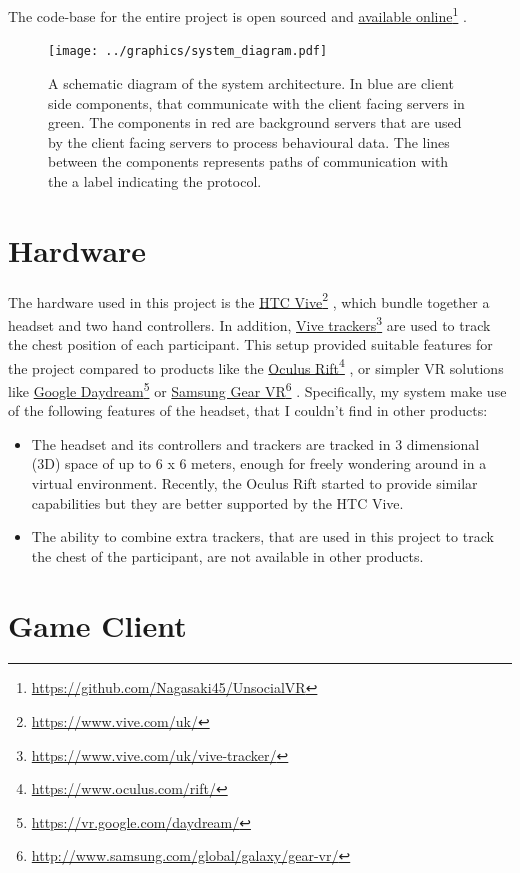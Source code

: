 \documentclass[]{simple-thesis}
\newcommand\fnurl[2]{%
  \href{#2}{#1}\footnote{\url{#2}}%
}
\begin{document}
The code-base for the entire project is open sourced and \fnurl{available online}{https://github.com/Nagasaki45/UnsocialVR}.

\begin{figure}
  \texttt{[image: ../graphics/system\_diagram.pdf]}
  \caption{A schematic diagram of the system architecture. In blue are client side components, that communicate with the client facing servers in green. The components in red are background servers that are used by the client facing servers to process behavioural data. The lines between the components represents paths of communication with the a label indicating the protocol.}
  \label{fig:system:diagram}
\end{figure}

\section{Hardware}

The hardware used in this project is the \fnurl{HTC Vive}{https://www.vive.com/uk/}, which bundle together a headset and two hand controllers.
In addition, \fnurl{Vive trackers}{https://www.vive.com/uk/vive-tracker/} are used to track the chest position of each participant.
This setup provided suitable features for the project compared to products like the \fnurl{Oculus Rift}{https://www.oculus.com/rift/}, or simpler VR solutions like \fnurl{Google Daydream}{https://vr.google.com/daydream/} or \fnurl{Samsung Gear VR}{http://www.samsung.com/global/galaxy/gear-vr/}.
Specifically, my system make use of the following features of the headset, that I couldn't find in other products:

\begin{itemize}
  \item The headset and its controllers and trackers are tracked in 3 dimensional (3D) space of up to 6 x 6 meters, enough for freely wondering around in a virtual environment. Recently, the Oculus Rift started to provide similar capabilities but they are better supported by the HTC Vive.
  \item The ability to combine extra trackers, that are used in this project to track the chest of the participant, are not available in other products.
\end{itemize}

\section{Game Client}
\end{document}

